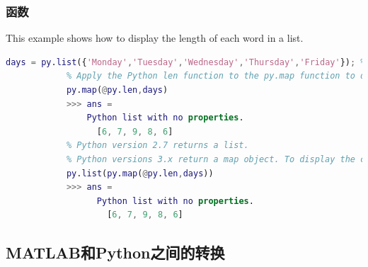         \subsubsection{函数}
            \par
            This example shows how to display the length of each word in a list.
            \begin{lstlisting}[language = Matlab]
            days = py.list({'Monday','Tuesday','Wednesday','Thursday','Friday'}); %Create a list of days of the work week.
            % Apply the Python len function to the py.map function to display the length of each word. Use the MATLAB function handle notation(符号), @, to indicate py.len is a function.
            py.map(@py.len,days)
            >>> ans =
                Python list with no properties.
                  [6, 7, 9, 8, 6]
            % Python version 2.7 returns a list.
            % Python versions 3.x return a map object. To display the contents, type:
            py.list(py.map(@py.len,days))
            >>> ans =
                  Python list with no properties.
                    [6, 7, 9, 8, 6]
            \end{lstlisting}
    \subsection{MATLAB和Python之间的转换}
